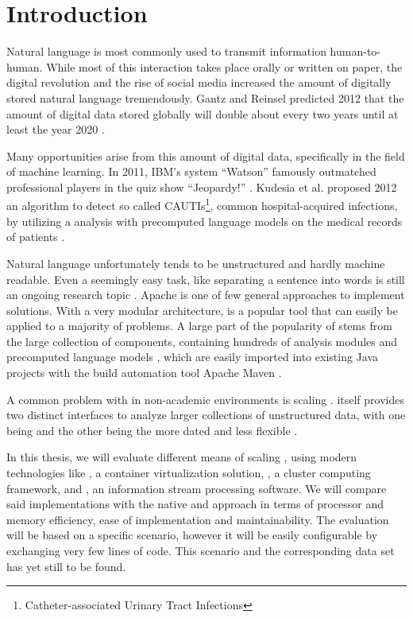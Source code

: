 \chapter{Introduction}

Natural language is most commonly used to transmit information human-to-human. While most of this interaction takes place orally or written on paper, the digital revolution and the rise of social media increased the amount of digitally stored natural language tremendously. Gantz and Reinsel predicted 2012 that the amount of digital data stored globally will double about every two years until at least the year 2020 \cite{gantz2012digital}.

Many opportunities arise from this amount of digital data, specifically in the field of machine learning. In 2011, IBM's \qa{} system ``Watson'' famously outmatched professional players in the quiz show ``Jeopardy!'' \cite{ferrucci2012introduction,epstein2012making}. Kudesia et al. proposed 2012 an algorithm to detect so called CAUTIs\footnote{Catheter-associated Urinary Tract Infections}, common hospital-acquired infections, by utilizing a \nlp{} analysis with precomputed language models on the medical records of patients \cite{kudesia2012natural}.

Natural language unfortunately tends to be unstructured and hardly machine readable. Even a seemingly easy task, like separating a sentence into words is still an ongoing research topic \cite{pak2018text}. Apache \uima{} is one of few general approaches to implement \nlp{} solutions. With a very modular architecture, \uima{} is a popular tool that can easily be applied to a majority of \nlp{} problems. A large part of the popularity of \uima{} stems from the large \dkpro{} collection of components, containing hundreds of analysis modules and precomputed language models \cite{eckartdecastilho-gurevych:2014:OIAF4HLT}, which are easily imported into existing Java projects with the build automation tool Apache Maven \cite{dkpro}.

A common problem with \uima{} in non-academic environments is scaling \cite{divita2015scaling,epstein2012making,ramakrishnan2010building}. \uima{} itself provides two distinct interfaces to analyze larger collections of unstructured data, with one being \uimaas{} and the other being the more dated and less flexible \cpe{} \cite{OASIS:UIMA:2009}.

In this thesis, we will evaluate different means of scaling \uima{}, using modern technologies like \docker{}, a container virtualization solution, \spark{}, a cluster computing framework, and \kafka{}, an information stream processing software. We will compare said implementations with the native \uimaas{} and \cpe{} approach in terms of processor and memory efficiency, ease of implementation and maintainability. The evaluation will be based on a specific scenario, however it will be easily configurable by exchanging very few lines of code. This scenario and the corresponding data set has yet still to be found.



